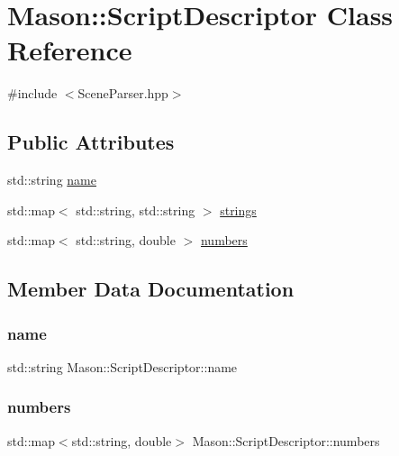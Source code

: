 \hypertarget{class_mason_1_1_script_descriptor}{}\section{Mason\+:\+:Script\+Descriptor Class Reference}
\label{class_mason_1_1_script_descriptor}


{\ttfamily \#include $<$Scene\+Parser.\+hpp$>$}

\subsection*{Public Attributes}
\begin{DoxyCompactItemize}
\item 
std\+::string \hyperlink{class_mason_1_1_script_descriptor_aa04b0220bbef995dce7e14a778449460}{name}
\item 
std\+::map$<$ std\+::string, std\+::string $>$ \hyperlink{class_mason_1_1_script_descriptor_a426d001b44ece88ba6b465b0505724c4}{strings}
\item 
std\+::map$<$ std\+::string, double $>$ \hyperlink{class_mason_1_1_script_descriptor_a4280fa9820a476c7640bde5af20e8e9c}{numbers}
\end{DoxyCompactItemize}


\subsection{Member Data Documentation}
\hypertarget{class_mason_1_1_script_descriptor_aa04b0220bbef995dce7e14a778449460}{}\label{class_mason_1_1_script_descriptor_aa04b0220bbef995dce7e14a778449460} 
\subsubsection{\texorpdfstring{name}{name}}
{\footnotesize\ttfamily std\+::string Mason\+::\+Script\+Descriptor\+::name}

\hypertarget{class_mason_1_1_script_descriptor_a4280fa9820a476c7640bde5af20e8e9c}{}\label{class_mason_1_1_script_descriptor_a4280fa9820a476c7640bde5af20e8e9c} 
\subsubsection{\texorpdfstring{numbers}{numbers}}
{\footnotesize\ttfamily std\+::map$<$std\+::string, double$>$ Mason\+::\+Script\+Descriptor\+::numbers}

